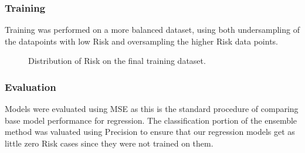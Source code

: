 \subsubsection{Training}
Training was performed on a more balanced dataset, using both undersampling of the datapoints with low Risk and oversampling the higher Risk data points.
\begin{figure}
    \centering
    \caption{Distribution of Risk on the final training dataset.}
    \label{fig:distribution-balanced-dataset}
\end{figure}
\subsubsection{Evaluation}
Models were evaluated using MSE as this is the standard procedure of comparing base model performance for regression. The classification portion of the ensemble method was valuated using Precision to ensure that our regression models get as little zero Risk cases since they were not trained on them.

